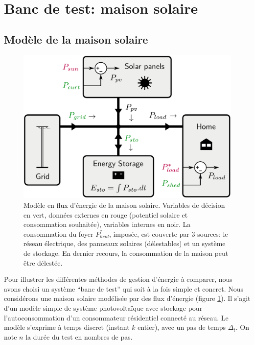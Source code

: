 \documentclass[a4paper,10pt,twocolumn]{article}
\begin{document}
\section{Banc de test: maison solaire}

\subsection{Modèle de la maison solaire}

\begin{figure}[!ht]
        \begin{center}
                \includegraphics[width=0.9\columnwidth]{figures/solar_home.pdf}
        \end{center}

        \caption{Modèle en flux d'énergie de la maison solaire.
        Variables de décision en vert, données externes en rouge (potentiel solaire et consommation souhaitée), variables internes en noir.
        La consommation du foyer $P_{load}^*$, imposée, est couverte par 3 sources:
        le réseau électrique, des panneaux solaires (délestables)
        et un système de stockage.
        En dernier recours, la consommation de la maison peut être délestée.
        }
        \label{fig:solhome}
\end{figure}

Pour illustrer les différentes méthodes de gestion d'énergie à comparer,
nous avons choisi un système ``banc de test'' qui soit à la fois simple et concret.
Nous considérons une maison solaire modélisée par
des flux d'énergie (figure \ref{fig:solhome}).
Il s'agit d'un modèle simple de système photovoltaïque avec stockage
pour l'autoconsommation d'un consommateur résidentiel connecté au réseau.
Le modèle s'exprime à temps discret (instant $k$ entier),
avec un pas de temps $\Delta_t$. On note $n$ la durée du test
en nombres de pas.
\end{document}
